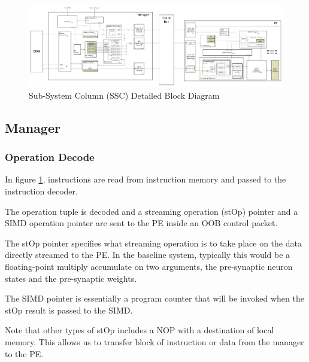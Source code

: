 \documentclass[journal]{IEEEtran}
\begin{document}
\begin{figure}[!t]
\centering
\captionsetup{justification=centering}
\centerline{
\mbox{\includegraphics[width=6.0in]{DetailedBlockDiagram.jpg}}
}
\center\caption{Sub-System Column (SSC) Detailed Block Diagram}
\label{fig:DetailedBlockDiagram}
\end{figure}

\subsection{Manager}
\label{sec:manager}

\subsubsection{Operation Decode}
\label{ssec:operationDecode}

In figure \ref{fig:DetailedBlockDiagram}, instructions are read from instruction memory and passed to the instruction decoder.

The operation tuple is decoded and a streaming operation (stOp) pointer and a SIMD operation pointer are sent to the PE inside an OOB control packet.

The stOp pointer specifies what streaming operation is to take place on the data directly streamed to the PE. In the baseline system, typically this would be a floating-point multiply accumulate on two arguments, the pre-synaptic neuron states and the pre-synaptic weights.

The SIMD pointer is essentially a program counter that will be invoked when the stOp result is passed to the SIMD.

Note that other types of stOp includes a NOP with a destination of local memory. This allows us to transfer block of instruction or data from the manager to the PE.
\end{document}
